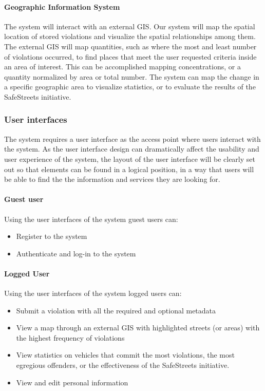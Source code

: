 \paragraph{Geographic Information System} The system will interact with an external GIS. Our system will map the spatial location of stored violations and visualize the spatial relationships among them. The external GIS will map quantities, such as where the most and least number of violations occurred, to find places that meet the user requested criteria inside an area of interest. This can be accomplished mapping concentrations, or a quantity normalized by area or total number. The system can map the change in a specific geographic area to visualize statistics, or to evaluate the results of the SafeStreets initiative.	

\subsubsection{User interfaces}

The system requires a user interface as the access point where users interact with the system. As the user interface design can dramatically affect the usability and user experience of the system, the layout of the user interface will be clearly set out so that elements can be found in a logical position, in a way that users will be able to find the the information and services they are looking for.

\paragraph{Guest user}
	Using the user interfaces of the system guest users can:
	\begin{itemize}
		\item Register to the system
		\item Authenticate and log-in to the system
	\end{itemize}
	
\paragraph{Logged User}
	Using the user interfaces of the system logged users can:
	\begin{itemize}
		\item Submit a violation with all the required and optional metadata
		\item View a map through an external GIS with highlighted streets (or areas) with the highest frequency of violations
		\item View statistics on vehicles that commit the most violations, the most egregious offenders, or the effectiveness of the SafeStreets initiative.
		\item View and edit personal information
	\end{itemize}
		
